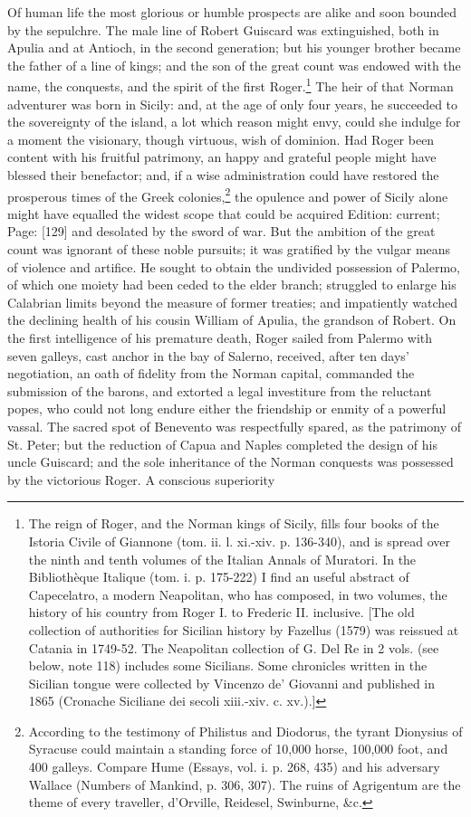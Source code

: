 Of human life the most glorious or humble prospects are alike and soon bounded by the sepulchre. The male line of Robert Guiscard was extinguished, both in Apulia and at Antioch, in the second generation; but his younger brother became the father of a line of kings; and the son of the great count was endowed with the name, the conquests, and the spirit of the first Roger.\footnote{The reign of Roger, and the Norman kings of Sicily, fills four books of the Istoria Civile of Giannone (tom. ii. l. xi.-xiv. p. 136-340), and is spread over the ninth and tenth volumes of the Italian Annals of Muratori. In the Bibliothèque Italique (tom. i. p. 175-222) I find an useful abstract of Capecelatro, a modern Neapolitan, who has composed, in two volumes, the history of his country from Roger I. to Frederic II. inclusive. [The old collection of authorities for Sicilian history by Fazellus (1579) was reissued at Catania in 1749-52. The Neapolitan collection of G. Del Re in 2 vols. (see below, note 118) includes some Sicilians. Some chronicles written in the Sicilian tongue were collected by Vincenzo de\texthebrew{}’ Giovanni and published in 1865 (Cronache Siciliane dei secoli xiii.-xiv. c. xv.).]} The heir of that Norman adventurer was born in Sicily: and, at the age of only four years, he succeeded to the sovereignty of the island, a lot which reason might envy, could she indulge for a moment the visionary, though virtuous, wish of dominion. Had Roger been content with his fruitful patrimony, an happy and grateful people might have blessed their benefactor; and, if a wise administration could have restored the prosperous times of the Greek colonies,\footnote{According to the testimony of Philistus and Diodorus, the tyrant Dionysius of Syracuse could maintain a standing force of 10,000 horse, 100,000 foot, and 400 galleys. Compare Hume (Essays, vol. i. p. 268, 435) and his adversary Wallace (Numbers of Mankind, p. 306, 307). The ruins of Agrigentum are the theme of every traveller, d\texthebrew{}’Orville, Reidesel, Swinburne, \&c.} the opulence and power of Sicily alone might have equalled the widest scope that could be acquired Edition: current; Page: [129] and desolated by the sword of war. But the ambition of the great count was ignorant of these noble pursuits; it was gratified by the vulgar means of violence and artifice. He sought to obtain the undivided possession of Palermo, of which one moiety had been ceded to the elder branch; struggled to enlarge his Calabrian limits beyond the measure of former treaties; and impatiently watched the declining health of his cousin William of Apulia, the grandson of Robert. On the first intelligence of his premature death, Roger sailed from Palermo with seven galleys, cast anchor in the bay of Salerno, received, after ten days\texthebrew{}’ negotiation, an oath of fidelity from the Norman capital, commanded the submission of the barons, and extorted a legal investiture from the reluctant popes, who could not long endure either the friendship or enmity of a powerful vassal. The sacred spot of Benevento was respectfully spared, as the patrimony of St. Peter; but the reduction of Capua and Naples completed the design of his uncle Guiscard; and the sole inheritance of the Norman conquests was possessed by the victorious Roger. A conscious superiority 